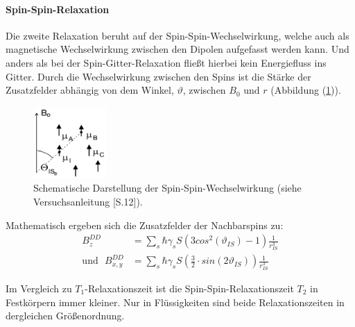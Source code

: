 \paragraph{Spin-Spin-Relaxation}
Die zweite Relaxation be{\-}ruht auf der Spin-Spin-Wechselwirkung, welche auch als magnetische Wechselwirkung zwischen den Dipolen aufgefasst werden kann.
Und anders als bei der Spin-Gitter-Relaxation flie{\ss}t hierbei kein Energiefluss ins Gitter.
Durch die Wechselwirkung zwischen den Spins ist die St\"{a}rke der Zusatzfelder abh\"{a}ngig von dem Winkel, $\vartheta$, zwischen $B_0$ und $r$ (Abbildung (\ref{SpinSpin})).
\begin{figure}
	\centering
	\includegraphics[width=0.25\textwidth]{Plots/spin_spin.png}
	\caption{Schematische Darstellung der Spin-Spin-Wechselwirkung (siehe Versuchsanleitung \cite{Anleitung}[S.12]).}
	\label{SpinSpin}
\end{figure}
Mathematisch ergeben sich die Zusatzfelder der Nachbarspins zu:
\begin{align*}
	B_z^{DD} &= \sum_s \hbar \gamma_s S \left( 3 cos^2 \left(\vartheta_{IS}\right) - 1 \right) \frac{1}{r_{IS}^3} \\
	\text{und} \, \, \, \, B_{x,y}^{DD} &= \sum_s \hbar \gamma_s S \left( \frac{3}{2} \cdot sin\left(2 \vartheta_{IS}\right) \right) \frac{1}{r_{IS}^3} 
\end{align*}

Im Vergleich zu $T_1$-Relaxationszeit ist die Spin-Spin-Relaxationszeit $T_2$ in Festk\"{o}rpern immer kleiner.
Nur in Fl\"{u}ssigkeiten sind beide Relaxationszeiten in dergleichen Gr\"{o}{\ss}en{\-}ord{\-}nung.

